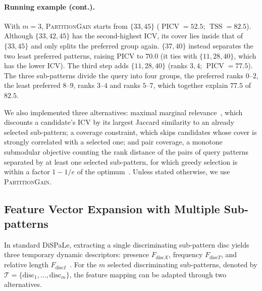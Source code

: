 \documentclass[sigconf]{acmart}
\newcommand{\PICV}{\operatorname{PICV}}
\newcommand{\TSS}{\operatorname{TSS}}
\newcommand{\disc}{\mathrm{disc}}
\begin{document}
\paragraph{Running example (cont.).}
With $m=3$, \textsc{PartitionGain} starts from $\{33,45\}$ ($\PICV=52.5$; $\TSS=82.5$). Although $\{33,42,45\}$ has the second-highest ICV, its cover lies inside that of $\{33,45\}$ and only splits the preferred group again. $\{37,40\}$ instead separates the two least preferred patterns, raising PICV to $70.0$ (it ties with $\{11,28,40\}$, which has the lower ICV). The third step adds $\{11,28,40\}$ (ranks $3,4$; $\PICV=77.5$). The three sub-patterns divide the query into four groups, the preferred ranks $0$--$2$, the least preferred $8$--$9$, ranks $3$--$4$ and ranks $5$--$7$, which together explain $77.5$ of $82.5$.

We also implemented three alternatives: maximal marginal relevance~\cite{carbonell1998}, which discounts a candidate's ICV by its largest Jaccard similarity to an already selected sub-pattern; a coverage constraint, which skips candidates whose cover is strongly correlated with a selected one; and pair coverage, a monotone submodular objective counting the rank distance of the pairs of query patterns separated by at least one selected sub-pattern, for which greedy selection is within a factor $1-1/e$ of the optimum~\cite{nemhauser1978}. Unless stated otherwise, we use \textsc{PartitionGain}.

\subsection{Feature Vector Expansion with Multiple Sub-patterns}
In standard DiSPaLe, extracting a single discriminating sub-pattern $\disc$ yields three temporary dynamic descriptors: presence $F_{\disc X}$, frequency $F_{\disc T}$, and relative length $F_{\disc I}$~\cite{hien2023}. For the $m$ selected discriminating sub-patterns, denoted by $\mathcal T=\{\disc_1,\ldots,\disc_{m}\}$, the feature mapping can be adapted through two alternatives.
\end{document}
